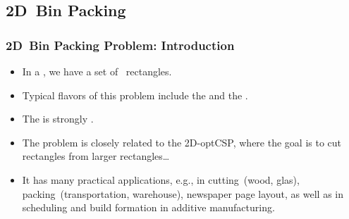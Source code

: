 \documentclass[aspectratio=169,mathserif,notheorems]{beamer}%
\begin{document}
\subsection{2D~Bin Packing}%
%
\begin{frame}[t]%
\frametitle{2D~Bin Packing Problem: Introduction}%
\begin{itemize}%
\item In a , we have a set of \scale~rectangles\cite{LMM2002TDPPAS,LMV2002RAOTDBPP,IdLMMM2021ESTFTDCAP}.%
%
\item<4-> Typical flavors of this problem include the  and the .%
%
\item<5-> The  is strongly \npHard\cite{LMV2002RAOTDBPP}.%
%
\item<6-> The problem is closely related to the 2D\nobreakdashes-\gls{optCSP}, where the goal is to cut rectangles from larger rectangles\dots%
%
\item<7-> It has many practical applications, e.g., in cutting~(wood, glas)\cite{LMV2002RAOTDBPP}, packing~(transportation, warehouse)\cite{LMV2002RAOTDBPP}, newspaper page layout\cite{SH2008ALOPNP}, as well as in scheduling and build formation in additive manufacturing\cite{PSTM2024SIORAMSNASOOAMSMTT,LZ2018SBPMSWTDBPC}.%
%
\end{itemize}%
%
%
%
%
%
\end{frame}%
%
\end{document}
